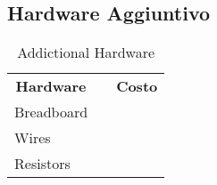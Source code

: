 \subsection{Hardware Aggiuntivo}

\begin{table}[]
\centering
\begin{tabular}{lll}
\multicolumn{1}{c}{\textbf{Hardware}} &  & \multicolumn{1}{c}{\textbf{Costo}} \\
Breadboard                            &  &                                   \\
Wires                                 &  &                                   \\
Resistors                             &  &                                  
\end{tabular}
\caption{Addictional Hardware}
\label{Addictional Hardware}
\end{table}

\newpage
